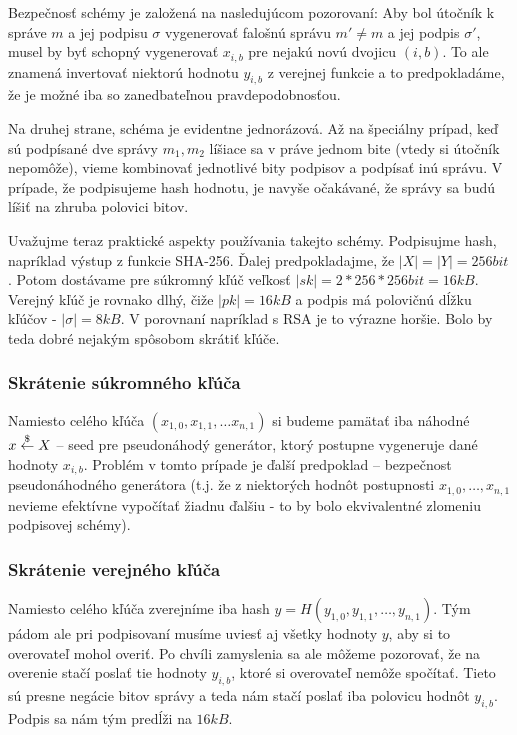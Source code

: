 Bezpečnosť schémy je založená na nasledujúcom pozorovaní:
Aby bol útočník k správe $m$ a jej podpisu $\sigma$ vygenerovať
falošnú správu $m' \ne m$ a jej podpis $\sigma'$, musel by byť schopný
vygenerovať $x_{i,b}$ pre nejakú novú dvojicu $(i,b)$.
To ale znamená invertovať niektorú hodnotu $y_{i,b}$ z verejnej
funkcie a to predpokladáme, že je možné iba so zanedbateľnou
pravdepodobnosťou.

Na druhej strane, schéma je evidentne jednorázová.
Až na špeciálny prípad, keď sú podpísané dve správy $m_1,m_2$ líšiace
sa v práve jednom bite (vtedy si útočník nepomôže), vieme kombinovať
jednotlivé bity podpisov a podpísať inú správu. V prípade, že
podpisujeme hash hodnotu, je navyše očakávané, že správy sa budú líšiť
na zhruba polovici bitov.

\medskip
Uvažujme teraz praktické aspekty používania takejto schémy. Podpisujme
hash, napríklad výstup z funkcie SHA-256. Ďalej predpokladajme, že
$|X|=|Y|=256 \unit{bit}$. Potom dostávame pre súkromný kľúč veľkosť
$|sk|=2*256*256 \unit{bit} =16 \unit{kB}$. Verejný kľúč je rovnako dlhý, čiže
$|pk|=16 \unit{kB}$ a podpis má polovičnú dĺžku kľúčov - $|\sigma|=8
\unit{kB}$.
V porovnaní napríklad s RSA je to výrazne horšie. Bolo by teda dobré
nejakým spôsobom skrátiť kľúče.

\subsubsection{Skrátenie súkromného kľúča}

Namiesto celého kľúča $(x_{1,0}, x_{1,1},
\ldots x_{n,1})$ si budeme pamätať iba náhodné $x \overset{\$}{\leftarrow} X$ -- seed pre
pseudonáhodý generátor, ktorý postupne vygeneruje dané hodnoty
$x_{i,b}$. Problém v tomto prípade je ďalší predpoklad -- bezpečnost
pseudonáhodného generátora (t.j. že z niektorých hodnôt postupnosti
$x_{1,0}, \ldots, x_{n,1}$ nevieme efektívne vypočítať žiadnu ďalšiu -
to by bolo ekvivalentné zlomeniu podpisovej schémy).

\subsubsection{Skrátenie verejného kľúča}
Namiesto celého kľúča zverejníme iba hash
$y=H(y_{1,0},y_{1,1},\ldots,y_{n,1})$. Tým pádom ale pri podpisovaní
musíme uviesť aj všetky hodnoty $y$, aby si to overovateľ mohol
overiť. Po chvíli zamyslenia sa ale môžeme pozorovať, že na overenie
stačí poslať tie hodnoty $y_{i,b}$, ktoré si overovateľ nemôže
spočítať. Tieto sú presne negácie bitov správy a teda nám stačí poslať
iba polovicu hodnôt $y_{i,b}$. Podpis sa nám tým predĺži na $16
\unit{kB}$.


